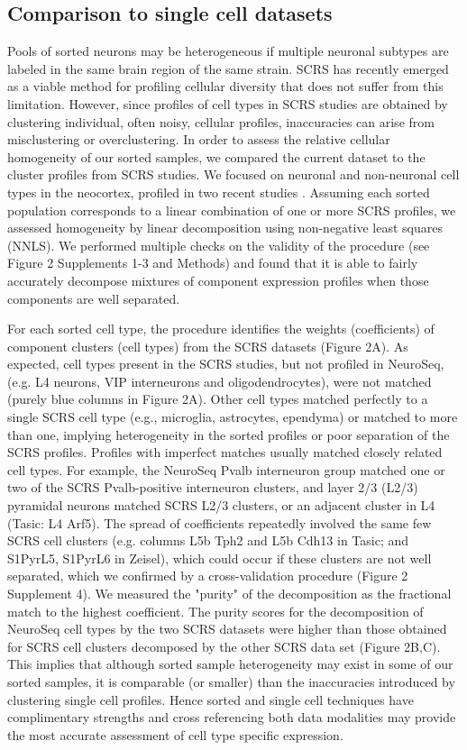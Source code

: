 \subsection{Comparison to single cell datasets}
Pools of sorted neurons may be heterogeneous if multiple neuronal subtypes are labeled in the same brain region of the same strain. SCRS has recently emerged as a viable method for profiling cellular diversity that does not suffer from this limitation. However, since profiles of cell types in SCRS studies are obtained by clustering individual, often noisy, cellular profiles, inaccuracies can arise from misclustering or overclustering. In order to assess the relative cellular homogeneity of our sorted samples, we compared the current dataset to the cluster profiles from SCRS studies. We focused on neuronal and non-neuronal cell types in the neocortex, profiled in two recent studies \citep{Tasic_2016,Zeisel_2015}. Assuming  each sorted population corresponds to a linear combination of one or more SCRS profiles, we assessed homogeneity by linear decomposition using non-negative least squares (NNLS). We performed multiple checks on the validity of the procedure (see Figure 2 Supplements 1-3 and Methods) and found that it is able to fairly accurately decompose mixtures of component expression profiles when those components are well separated. 

For each sorted cell type, the procedure identifies the weights (coefficients) of  component clusters (cell types) from the SCRS datasets (Figure 2A). As expected, cell types present in the SCRS studies, but not profiled in NeuroSeq, (e.g. L4 neurons, VIP interneurons and oligodendrocytes), were not matched (purely blue columns in Figure 2A). Other cell types matched perfectly to a single SCRS cell type (e.g., microglia, astrocytes, ependyma) or matched to more than one, implying heterogeneity in the sorted profiles or poor separation of the SCRS profiles. Profiles with imperfect matches usually matched closely related cell types. For example, the NeuroSeq Pvalb interneuron group matched one or two of the SCRS Pvalb-positive interneuron clusters, and layer 2/3 (L2/3) pyramidal neurons matched SCRS L2/3 clusters, or an adjacent cluster in L4 (Tasic: L4 Arf5). The spread of coefficients repeatedly involved the same few SCRS cell clusters (e.g. columns L5b Tph2 and L5b Cdh13 in Tasic; and S1PyrL5,  S1PyrL6 in Zeisel), which could occur if these clusters are not well separated, which we confirmed by a cross-validation procedure (Figure 2 Supplement 4). We measured the "purity" of the decomposition as the fractional match to the highest coefficient. The purity scores for the decomposition of NeuroSeq cell types by the two SCRS datasets were higher than those obtained for SCRS cell clusters decomposed by the other SCRS data set (Figure 2B,C). This implies that although sorted sample heterogeneity may exist in some of our sorted samples, it is comparable (or smaller) than the inaccuracies introduced by clustering single cell profiles. Hence sorted and single cell techniques have complimentary strengths and cross referencing both data modalities may provide the most accurate assessment of cell type specific expression. 



